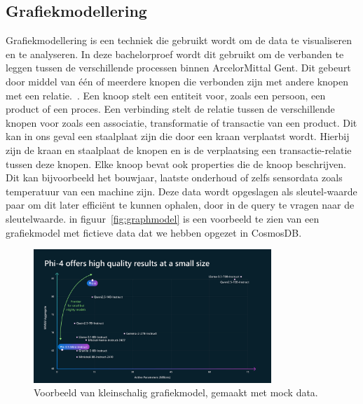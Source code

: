 \subsection{Grafiekmodellering}
Grafiekmodellering is een techniek die gebruikt wordt om de data te visualiseren en te analyseren. In deze bachelorproef wordt dit gebruikt om de verbanden te leggen tussen de verschillende processen binnen ArcelorMittal Gent.
Dit gebeurt door middel van één of meerdere knopen die verbonden zijn met andere knopen met een relatie.~\autocite{neo4j20252}.
Een knoop stelt een entiteit voor, zoals een persoon, een product of een proces. Een verbinding stelt de relatie tussen de verschillende knopen voor zoals een associatie, transformatie of transactie van een product.
Dit kan in ons geval een staalplaat zijn die door een kraan verplaatst wordt. Hierbij zijn de kraan en staalplaat de knopen en is de verplaatsing een transactie-relatie tussen deze knopen.
Elke knoop bevat ook properties die de knoop beschrijven. Dit kan bijvoorbeeld het bouwjaar, laatste onderhoud of zelfs sensordata zoals temperatuur van een machine zijn.
Deze data wordt opgeslagen als sleutel-waarde paar om dit later efficiënt te kunnen ophalen, door in de query te vragen naar de sleutelwaarde.
in figuur~\ref{fig:graphmodel} is een voorbeeld te zien van een grafiekmodel met fictieve data dat we hebben opgezet in CosmosDB.\@

\begin{figure}[H]
     \centering
     \includegraphics[width=0.8\textwidth]{./img/MMLU.png}
     \caption[Voorbeeld Grafiekmodel.]{\label{fig:MMLU}Voorbeeld van kleinschalig grafiekmodel, gemaakt met mock data.}
\end{figure}

